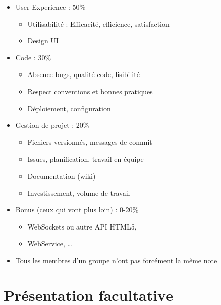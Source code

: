 \begin{itemize}
\tightlist
\item
  User Experience : 50\%

  \begin{itemize}
  \tightlist
  \item
    Utilisabilité : Efficacité, efficience, satisfaction
  \item
    Design UI
  \end{itemize}
\item
  Code : 30\%

  \begin{itemize}
  \tightlist
  \item
    Absence bugs, qualité code, lisibilité
  \item
    Respect conventions et bonnes pratiques
  \item
    Déploiement, configuration
  \end{itemize}
\item
  Gestion de projet : 20\%

  \begin{itemize}
  \tightlist
  \item
    Fichiers versionnés, messages de commit
  \item
    Issues, planification, travail en équipe
  \item
    Documentation (wiki)
  \item
    Investissement, volume de travail
  \end{itemize}
\item
  Bonus (ceux qui vont plus loin) : 0-20\%

  \begin{itemize}
  \tightlist
  \item
    WebSockets ou autre API HTML5,
  \item
    WebService, \ldots{}
  \end{itemize}
\item
  Tous les membres d'un groupe n'ont pas forcément la même note
\end{itemize}

\hypertarget{pruxe9sentation-facultative}{%
\section{Présentation facultative}\label{pruxe9sentation-facultative}}

